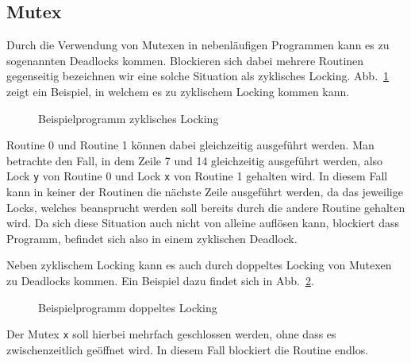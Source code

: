 \subsection{Mutex}\label{Chap:Back-Sec:Prob-SubSec:Mutex}
Durch die Verwendung von Mutexen in nebenläufigen Programmen kann es 
zu sogenannten Deadlocks kommen. Blockieren sich dabei mehrere Routinen 
gegenseitig bezeichnen wir eine solche Situation als zyklisches Locking.
Abb.~\ref{Chap:Analyze-Sec:Mutex-Fig:Zyclic} zeigt ein Beispiel, in welchem es zu zyklischem 
Locking kommen kann.
\begin{figure}[h!]
  
  \caption{Beispielprogramm zyklisches Locking}
  \label{Chap:Analyze-Sec:Mutex-Fig:Zyclic}
\end{figure}
Routine 0 und Routine 1 können dabei gleichzeitig ausgeführt werden. Man betrachte den Fall, in dem 
Zeile 7 und 14 gleichzeitig ausgeführt werden, also Lock \texttt{y} von Routine 0 und Lock \texttt{x} 
von Routine 1 gehalten wird. In diesem Fall kann in keiner der Routinen die nächste Zeile ausgeführt werden,
da das jeweilige Locks, welches beansprucht werden soll bereits durch die andere Routine gehalten wird. 
Da sich diese Situation auch nicht von alleine auflösen kann, blockiert dass Programm, befindet sich also 
in einem zyklischen Deadlock.

Neben zyklischem Locking kann es auch durch doppeltes Locking von Mutexen 
zu Deadlocks kommen. Ein Beispiel dazu findet sich in 
Abb.~\ref{Chap:Analyze-Sec:Mutex-Fig:Double}.
\begin{figure}[h!]
  
  \caption{Beispielprogramm doppeltes Locking}
  \label{Chap:Analyze-Sec:Mutex-Fig:Double}
\end{figure}
Der Mutex \texttt{x} soll hierbei mehrfach geschlossen werden, ohne dass 
es zwischenzeitlich geöffnet wird. In diesem Fall blockiert die Routine
endlos.


